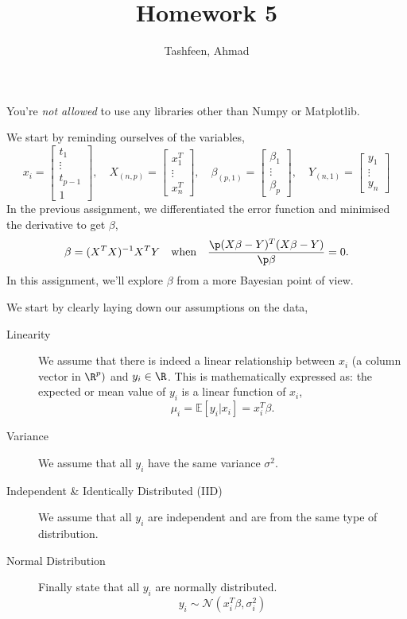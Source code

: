 \documentclass{homework}
\author{Tashfeen, Ahmad}
\title{Homework 5}
\begin{document}
 \maketitle
You're \textit{not allowed} to use any libraries other than Numpy or Matplotlib.

We start by reminding ourselves of the variables,
\[
  x_i =
  \begin{bmatrix}
    t_1 \\ \vdots \\ t_{p-1} \\ 1
  \end{bmatrix},
  \quad
  X_{(n, p)} =
  \begin{bmatrix}
    x^T_1 \\ \vdots \\ x^T_n
  \end{bmatrix},
  \quad
  \beta_{(p, 1)} =
  \begin{bmatrix}
    \beta_1 \\ \vdots \\ \beta_p
  \end{bmatrix},
  \quad
  Y_{(n, 1)} =
  \begin{bmatrix}
    y_1 \\ \vdots \\ y_n
  \end{bmatrix}
\]
In the previous assignment, we differentiated the error function and minimised the derivative to get $\beta$,
\[
    \beta = (X^TX)^{-1}X^TY \quad\text{when}\quad \frac{\p (X\beta - Y)^T(X\beta - Y)}{\p \beta} = 0.
\]
In this assignment, we'll explore $\beta$ from a more Bayesian point of view.

We start by clearly laying down our assumptions on the data,

\begin{description}
    \item[Linearity] We assume that there is indeed a linear relationship between $x_i$ (a column vector in $\R^p)$ and $y_i \in \R$. This is mathematically expressed as: the expected or mean value of $y_i$ is a linear function of $x_i$,
    \[
        \mu_i = \mathbb{E}[y_i|x_i] = x_{i}^{T}\beta.
    \]
    \item[Variance] We assume that all $y_i$ have the same variance $\sigma^2$.
    \item[Independent \& Identically Distributed (IID)] We assume that all $y_i$ are independent and are from the same type of distribution.
    \item[Normal Distribution] Finally state that all $y_i$ are normally distributed.
    \[
        y_i \sim \mathcal{N}(x_{i}^{T}\beta, \sigma^2_i)
    \]
\end{description}
\end{document}
